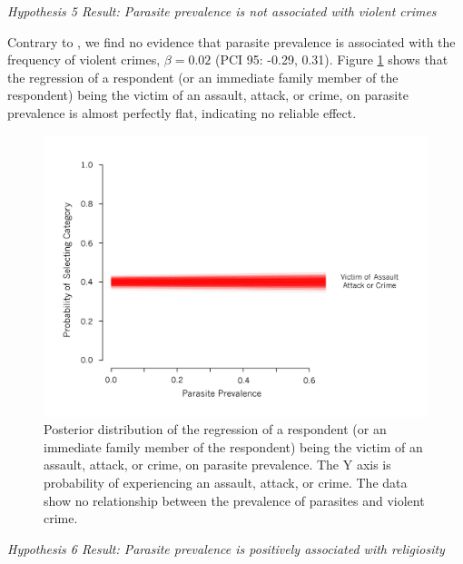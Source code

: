 \documentclass[12pt]{article}
\begin{document}
\noindent\textit{Hypothesis 5 Result: Parasite prevalence is not associated with violent crimes}

	Contrary to \citet{Thornhill2011}, we find no evidence that parasite prevalence is associated with the frequency of violent crimes, $\beta=0.02$ (PCI 95: -0.29, 0.31). Figure \ref{resViolence} shows that the regression of a respondent (or an immediate family member of the respondent) being the victim of an assault, attack, or crime, on parasite prevalence is almost perfectly flat, indicating no reliable effect.\\
 \begin{figure}
\caption{\label{resViolence}  Posterior distribution of the regression of a respondent (or an immediate family member of the respondent) being the victim of an assault, attack, or crime, on parasite prevalence. The Y axis is probability of experiencing an assault, attack, or crime.  The data show no relationship between the prevalence of parasites and violent crime.}
\includegraphics[width=5in]{Figures/ViolenceModel} 
\end{figure}  


\noindent\textit{Hypothesis 6 Result: Parasite prevalence is positively associated with religiosity}
\end{document}
